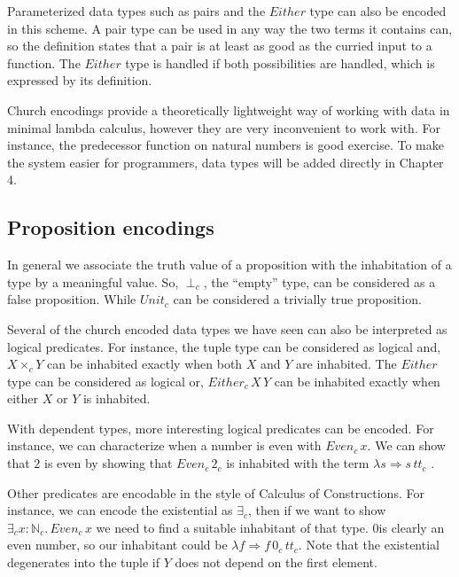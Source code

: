 Parameterized data types such as pairs and the $Either$ type can also be encoded in this scheme.
A pair type can be used in any way the two terms it contains can, so the definition states that a pair is at least as good as the curried input to a function.
The $Either$ type is handled if both possibilities are handled, which is expressed by its definition.



Church encodings provide a theoretically lightweight way of working with data in minimal lambda calculus, however they are very inconvenient to work with.
For instance, the predecessor function on natural numbers is good exercise.
To make the system easier for programmers, data types will be added directly in Chapter 4.

\subsection{Proposition encodings}

In general we associate the truth value of a proposition with the inhabitation of a type by a meaningful value.
So, $\perp_{c}$, the ``empty'' type, can be considered as a false proposition.
While $Unit_{c}$ can be considered a trivially true proposition.

Several of the church encoded data types we have seen can also be interpreted as logical predicates.
For instance, the tuple type can be considered as logical and, $X\times_{c}Y$ can be inhabited exactly when both $X$ and $Y$ are inhabited.
The $Either$ type can be considered as logical or, $Either_{c}\,X\,Y$ can be inhabited exactly when either $X$ or $Y$ is inhabited.

With dependent types, more interesting logical predicates can be encoded.
For instance, we can characterize when a number is even with $Even_{c}\,x$.
We can show that $2$ is even by showing that $Even_{c}\,2_{c}$ is inhabited with the term $\lambda s\Rightarrow s\,tt_{c}$ .

Other predicates are encodable in the style of Calculus of Constructions\cite{10.1016/0890-5401(88)90005-3}.
For instance, we can encode the existential as $\exists_{c}$, then if we want to show $\exists_{c}x:\mathbb{N}_{c}.\,Even_{c}\,x$ we need to find a suitable inhabitant of that type.
$0$is clearly an even number, so our inhabitant could be $\lambda f\Rightarrow f\,0_{c}\,tt_{c}$.
Note that the existential degenerates into the tuple if $Y$ does not depend on the first element.


